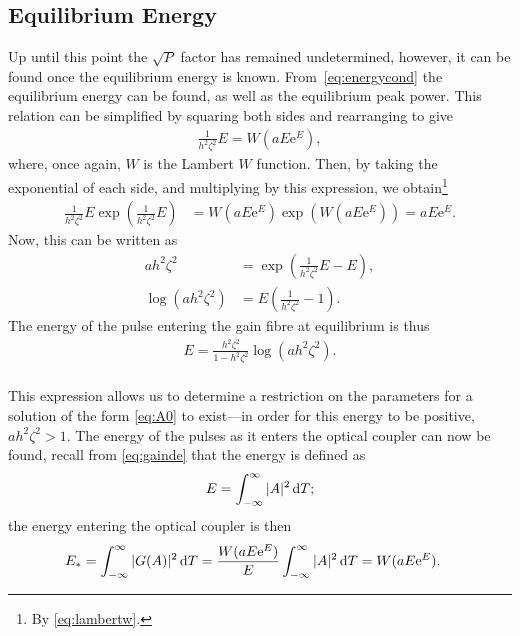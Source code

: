 

\subsection{Equilibrium Energy}
Up until this point the $\sqrt{P}$ factor has remained undetermined, however, it can be found once the equilibrium energy is known. From~\eqref{eq:energycond} the equilibrium energy can be found, as well as the equilibrium peak power. This relation can be simplified by squaring both sides and rearranging to give
\begin{align*}
\frac{1}{h^2 \zeta^2} E = W \left( a E \textrm{e}^E \right),
\end{align*}
where, once again, $W$ is the Lambert $W$ function. Then, by taking the exponential of each side, and multiplying by this expression, we obtain\footnote{By \eqref{eq:lambertw}.}
\begin{align*}
\frac{1}{h^2 \zeta^2} E \exp \left(\frac{1}{h^2 \zeta^2} E \right) &= W \left( a E \textrm{e}^E \right) \exp \left( W \left( a E \textrm{e}^E \right) \right) = a E \textrm{e}^E.
\end{align*}
Now, this can be written as 
\begin{align*}
a h^2 \zeta^2 &= \exp \left( \frac{1}{h^2 \zeta^2}E - E \right), \\
\log \left( a h^2 \zeta^2 \right) &= E \left( \frac{1}{h^2 \zeta^2} - 1 \right).
\end{align*}
The energy of the pulse entering the gain fibre at equilibrium is thus
\begin{align*}
E = \frac{h^2 \zeta^2}{1 - h^2 \zeta^2} \log \left( a h^2 \zeta^2 \right). \\
\end{align*}

This expression allows us to determine a restriction on the parameters for a solution of the form \eqref{eq:A0} to exist---in order for this energy to be positive, $a h^2 \zeta^2 > 1$. The energy of the pulses as it enters the optical coupler can now be found, recall from \eqref{eq:gainde} that the energy is defined as
\begin{align*}
E = \int_{-\infty}^\infty |A|^2 \, \textrm{d} T;
\end{align*}
the energy entering the optical coupler is then
\begin{align}
E_* &= \int_{-\infty}^\infty |G(A)|^2 \, \textrm{d} T = \frac{W(a E \textrm{e}^E)}{E} \int_{-\infty}^\infty |A|^2 \, \textrm{d} T = W(a E \textrm{e}^E).
\label{eq:equilenergy}
\end{align}


